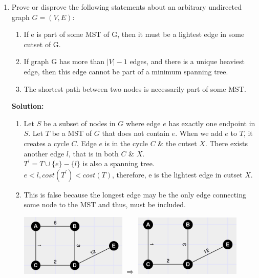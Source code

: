 \documentclass[11pt]{article}
\begin{document}
\begin{enumerate}
\begin{enumerate}
\end{enumerate}
\item
Prove or disprove the following statements about an
arbitrary undirected graph $G=(V,E)$:
\begin{enumerate}
\item If e is part of some MST of G, then it must be a lightest edge
  in some cutset of G.
\item If graph G has more than $|V | - 1$ edges, and there is a unique
  heaviest edge, then this edge cannot be part of a minimum spanning
  tree. 
\item The shortest path between two nodes is necessarily part of some MST.
\end{enumerate}
{\bf Solution:}\\
\begin{enumerate}
\item
Let $S$ be a subset of nodes in $G$ where edge $e$ has exactly one endpoint in $S$. Let $T$ be a MST of $G$ that does not contain $e$. When we add $e$ to $T$, it creates a cycle $C$. Edge $e$ is in the cycle $C$ \& the cutset $X$. There exists another edge $l$, that is in both $C$ \& $X$.\\
$T^{\prime} = T \cup \{e\} - \{l\}$ is also a spanning tree.\\
$e < l, cost(T^{\prime}) < cost(T)$, therefore, e is the lightest edge in cutset $X$.
\newpage
\item
This is false because the longest edge may be the only edge connecting some node to the MST and thus, must be included.\\

\begin{center}
\includegraphics[width=2in]{before.png}
$\Rightarrow$
\includegraphics[width=2in]{after.png}
\end{center}


\end{enumerate}
\end{enumerate}
\end{document}
